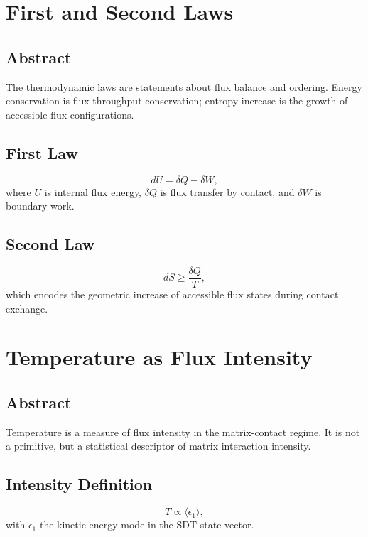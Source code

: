 \documentclass[12pt]{book}
\begin{document}
\chapter{First and Second Laws}

\section*{Abstract}
The thermodynamic laws are statements about flux balance and ordering. Energy conservation is flux
throughput conservation; entropy increase is the growth of accessible flux configurations.

\section{First Law}
\begin{equation}
dU = \delta Q - \delta W,
\end{equation}
where $U$ is internal flux energy, $\delta Q$ is flux transfer by contact, and $\delta W$ is boundary work.

\section{Second Law}
\begin{equation}
dS \ge \frac{\delta Q}{T},
\end{equation}
which encodes the geometric increase of accessible flux states during contact exchange.

\chapter{Temperature as Flux Intensity}

\section*{Abstract}
Temperature is a measure of flux intensity in the matrix-contact regime. It is not a primitive, but a
statistical descriptor of matrix interaction intensity.

\section{Intensity Definition}
\begin{equation}
T \propto \langle \epsilon_1 \rangle,
\end{equation}
with $\epsilon_1$ the kinetic energy mode in the SDT state vector.
\end{document}

